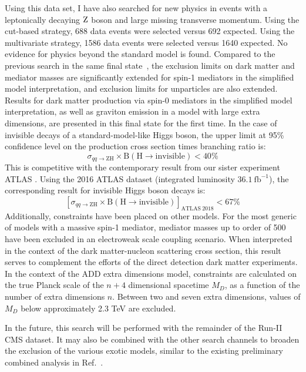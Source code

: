Using this data set, I have also searched for new physics in events with a
leptonically decaying $\mathrm{Z}$ boson and large missing transverse momentum.
Using the cut-based strategy, 688 data events were selected versus 692 expected.
Using the multivariate strategy, 1586 data events were selected versus 1640 expected. 
No evidence for physics beyond the standard model is found.
Compared to the previous search in the same final state~\cite{CMS-PAPER-EXO-16-010},
the exclusion limits on dark matter and mediator masses are significantly extended for spin-1 mediators in the simplified model interpretation, and exclusion limits for unparticles are also extended.
Results for dark matter production via spin-0 mediators in the simplified model interpretation,
as well as graviton emission in a model with large extra dimensions,
are presented in this final state for the first time.
\newpage
In the case of invisible decays of a standard-model-like Higgs boson,
the upper limit at 95\% confidence level on the production cross section times branching ratio is:
\begin{equation*}
\sigma_{qq\rightarrow\mathrm{ZH}} \times \mathrm{B(H \rightarrow invisible)} < 40\%
\end{equation*}
This is competitive with the contemporary result from our sister experiment ATLAS \cite{Aaboud:2017bja}.
Using the 2016 ATLAS dataset (integrated luminosity $36.1~\mathrm{fb}^{-1}$), 
the corresponding result for invisible Higgs boson decays is:
\begin{equation*}
\left[\sigma_{qq\rightarrow\mathrm{ZH}} \times \mathrm{B(H \rightarrow invisible)}\right]_\mathrm{ATLAS~2018} < 67\%
\end{equation*}
Additionally, constraints have been placed on other models.
For the most generic of models with a massive spin-1 mediator,
mediator masses up to order of 500 \GeV have been excluded in an electroweak scale coupling scenario.
When interpreted in the context of the dark matter-nucleon scattering cross section,
this result serves to complement the efforts of the direct detection dark matter experiments.
In the context of the ADD extra dimensions model, constraints are calculated on the true Planck scale of the $n+4$ dimensional spacetime $M_D$, as a function of the number of extra dimensions $n$.
Between two and seven extra dimensions, values of $M_D$ below approximately 2.3 TeV are excluded.

In the future, this search will be performed with the remainder of the Run-II CMS dataset.
It may also be combined with the other search channels to broaden the exclusion
of the various exotic models, similar to the existing preliminary combined analysis
in Ref.~\cite{CMS-PAPER-HIG-16-016}.


